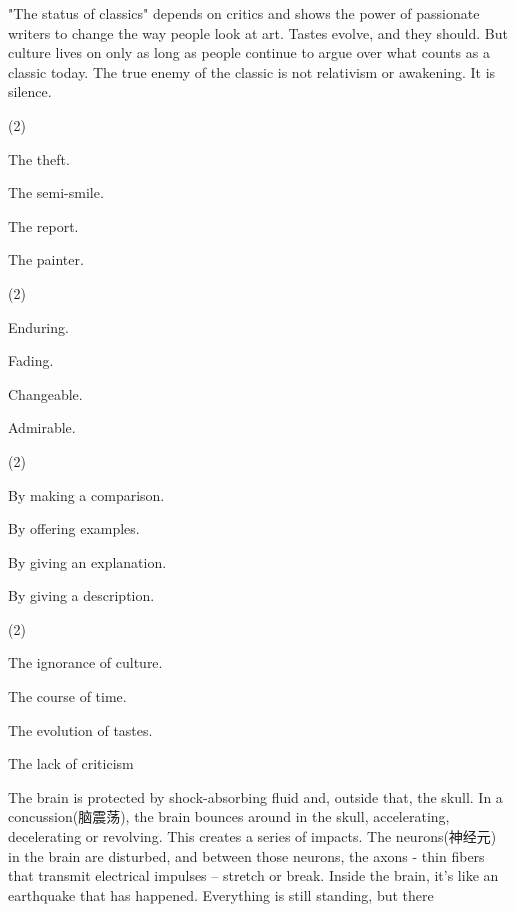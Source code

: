 \documentclass{英语试卷}
\begin{document}
\par "The status of classics" depends on critics and shows the power of passionate writers to change the way people look at art. Tastes evolve, and they should. But culture lives on only as long as people continue to argue over what counts as a classic today. The true enemy of the classic is not relativism or awakening. It is silence.\par
{}
\begin{choices}(2)
  \item The theft.
  \item The semi-smile.
  \item The report.
  \item The painter.
\end{choices}
\begin{choices}(2)
  \item Enduring.
  \item Fading.
  \item Changeable.
  \item Admirable.
\end{choices}
\begin{choices}(2)
  \item By making a comparison.
  \item By offering examples.
  \item By giving an explanation.
  \item By giving a description.
\end{choices}
\begin{choices}(2)
  \item The ignorance of culture.
  \item The course of time.
  \item The evolution of tastes.
  \item The lack of criticism
\end{choices}
\par The brain is protected by shock-absorbing fluid and, outside that, the skull. In a concussion(脑震荡), the brain bounces around in the skull, accelerating, decelerating or revolving. This creates a series of impacts. The neurons(神经元) in the brain are disturbed, and between those neurons, the axons - thin fibers that transmit electrical impulses – stretch or break. Inside the brain, it's like an earthquake that has happened. Everything is still standing, but there\par
\end{document}
